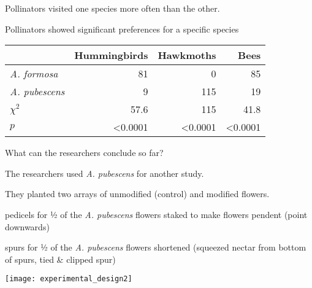 \documentclass[t,hidelinks]{beamer}
\begin{document}
\begin{frame}[t]{Pollinators visited one species more often than the other.}
\begin{multicols}{3}

	\end{multicols}
\end{frame}
%
\begin{frame}[t]{Pollinators showed significant preferences for a specific species}
		
	\begin{center}
	\begin{tabular}{lrrr}
	\toprule
		 	& Hummingbirds & Hawkmoths & Bees \tabularnewline
	\midrule
	\textit{A. formosa}		&	81	&	0	&	85 \tabularnewline
	\textit{A. pubescens}	&	9	&	115	&	19 \tabularnewline
	$\chi^2$				&	57.6	&	115	&	41.8 \tabularnewline
	$p$						&  \textless0.0001 & \textless0.0001 & \textless0.0001 \tabularnewline
	\bottomrule
	\end{tabular}
	\end{center}

	\hangpara What can the researchers conclude so far?
\end{frame}
%
\begin{frame}[t]{The researchers used \textit{A. pubescens} for another study.}
	
	\vspace*{-\baselineskip}
	
	\hangpara They planted two arrays of unmodified (control) and modified flowers.

	\hangpara {} pedicels for ½ of the \textit{A. pubescens} flowers staked to make flowers pendent (point downwards)
	
	\hangpara {} spurs for ½ of the \textit{A. pubescens} flowers shortened (squeezed nectar from bottom of spurs, tied \& clipped spur)
	
	\centering
	\texttt{[image: experimental\_design2]}

\end{frame}
\end{document}
